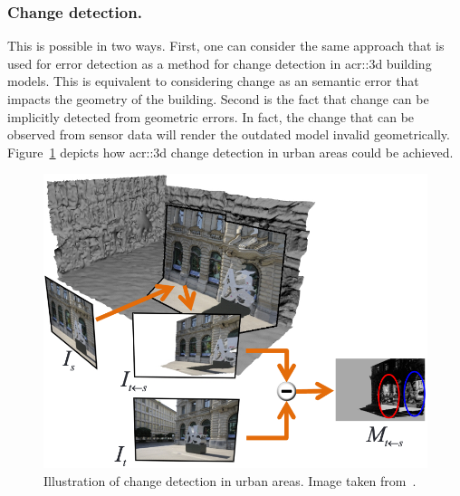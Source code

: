         \subsubsection{Change detection.}
            This is possible in two ways.
            First, one can consider the same approach that is used for error detection as a method for change detection in \gls{acr::3d} building models.
            This is equivalent to considering change as an semantic error that impacts the geometry of the building.
            Second is the fact that change can be implicitly detected from geometric errors.
            In fact, the change that can be observed from sensor data will render the outdated model invalid geometrically.
            Figure~\ref{fig::3d_change_detection} depicts how \gls{acr::3d} change detection in urban areas could be achieved.
            \begin{figure}[htb]
                \centering
                \includegraphics[width=.7\textwidth]{images/introduction/use/change_detection_taneja}
                \caption[
                    Illustration of change detection in urban areas.
                ]{
                    \label{fig::3d_change_detection}
                    Illustration of change detection in urban areas.
                    Image taken from~\parencite{taneja2013city}.
                }
            \end{figure}

